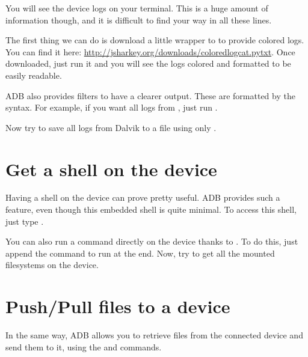 You will see the device logs on your terminal. This is a huge amount of
information though, and it is difficult to find your way in all these lines.

The first thing we can do is download a little wrapper to  to provide colored
logs. You can find it here: \url{http://jsharkey.org/downloads/coloredlogcat.pytxt}. Once downloaded, just run it and you will see the logs colored and
formatted to be easily readable.

ADB also provides filters to have a clearer output. These are formatted by the
 syntax. For example, if you want all logs from ,
just run .

Now try to save all logs from Dalvik to a file using only .

\section{Get a shell on the device}

Having a shell on the device can prove pretty useful. ADB provides such a feature,
even though this embedded shell is quite minimal. To access this shell,
just type .

You can also run a command directly on the device thanks to . To do
this, just append the command to run at the end. Now, try to get all the mounted
filesystems on the device.

\section{Push/Pull files to a device}

In the same way, ADB allows you to retrieve files from the connected device and send them
to it, using the  and  commands. 

